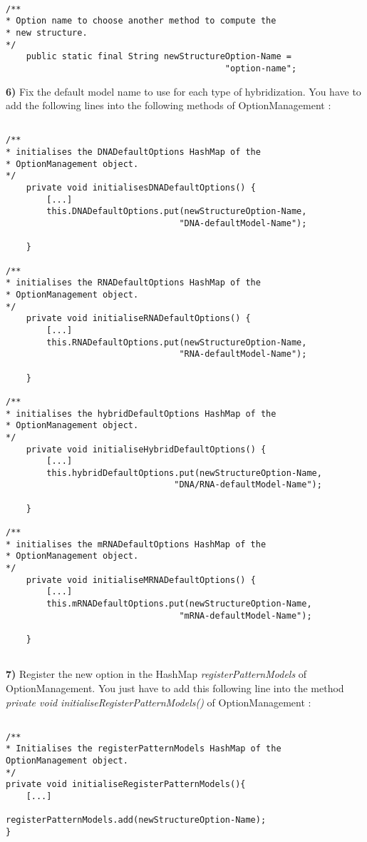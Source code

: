 \documentclass{article}
\begin{document}
 \begin{verbatim}

/**
* Option name to choose another method to compute the 
* new structure.
*/
	public static final String newStructureOption-Name = 
	                                       "option-name";

\end{verbatim}


\textbf{6)} Fix the default model name to use for each type of hybridization. You have to add
the following lines into the following methods of OptionManagement :

\begin{verbatim}

/**
* initialises the DNADefaultOptions HashMap of the 
* OptionManagement object.
*/
	private void initialisesDNADefaultOptions() {
		[...]
		this.DNADefaultOptions.put(newStructureOption-Name, 
		                          "DNA-defaultModel-Name");

	}
	
/**
* initialises the RNADefaultOptions HashMap of the 
* OptionManagement object.
*/
	private void initialiseRNADefaultOptions() {
		[...]
		this.RNADefaultOptions.put(newStructureOption-Name, 
		                          "RNA-defaultModel-Name");

	}
	
/**
* initialises the hybridDefaultOptions HashMap of the 
* OptionManagement object.
*/
	private void initialiseHybridDefaultOptions() {
		[...]
		this.hybridDefaultOptions.put(newStructureOption-Name, 
		                         "DNA/RNA-defaultModel-Name");
		
	}
	
/**
* initialises the mRNADefaultOptions HashMap of the 
* OptionManagement object.
*/
	private void initialiseMRNADefaultOptions() {
		[...]
		this.mRNADefaultOptions.put(newStructureOption-Name, 
		                          "mRNA-defaultModel-Name");

	}
	
\end{verbatim}


\textbf{7)} Register the new option in the HashMap \textit{registerPatternModels} of OptionManagement.
You just have to add this following line into the method \textit{private void initialiseRegisterPatternModels()}
of OptionManagement :

\begin{verbatim}

/**
* Initialises the registerPatternModels HashMap of the OptionManagement object.
*/
private void initialiseRegisterPatternModels(){
	[...]
		
registerPatternModels.add(newStructureOption-Name);
}

\end{verbatim}
\end{document}
